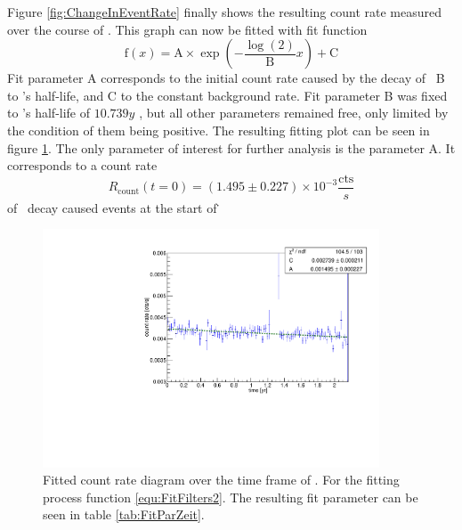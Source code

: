 \documentclass[encoding=utf8,british]{tumphthesis}
\begin{document}
Figure \ref{fig:ChangeInEventRate} finally shows the resulting count rate measured over the course of \PII.
This graph can now be fitted with fit function
\begin{equation}
\mathrm{f}(x) = \mathrm{A}\times\exp\left(-\frac{\log(2)}{\mathrm{B}} x \right) + \mathrm{C}
\label{equ:FitFilters2}
\end{equation}
Fit parameter A corresponds to the initial count rate caused by the decay of \Kr\, B to \Kr's half-life, and C to the constant background rate.
Fit parameter B was fixed to \Kr's half-life of \(10.739\unit{y}\) , but all other parameters remained free, only limited by the condition of them being positive.
The resulting fitting plot can be seen in figure  \ref{fig:ChangeInEventRateFit}.
The only parameter of interest for further analysis is the parameter \(\mathrm{A}\). 
It corresponds to a count rate  
\begin{equation*}
R_{\mathrm{count}}(t = 0) = (1.495\pm0.227) \times 10^{-3} \frac{\mathrm{cts}}{\unit{s}}
\end{equation*}of \Kr\ decay caused events at the start of \PII\.

\begin{figure}[t!]
	\centering
	\ifmakefigures%
	\includegraphics[width=100mm]{./Bilder/eventRateFit.pdf}
	\fi%
	\caption{
	    Fitted count rate diagram over the time frame of \PII.
	    For the fitting process function \ref{equ:FitFilters2}.
	    The resulting fit parameter can be seen in table \ref{tab:FitParZeit}.
	}
	\label{fig:ChangeInEventRateFit}
\end{figure}%
\end{document}
